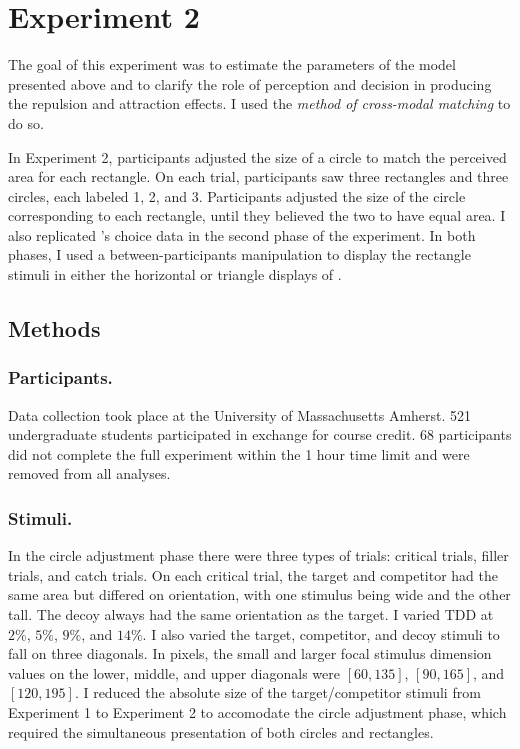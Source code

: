\section{Experiment 2}
The goal of this experiment was to estimate the parameters of the model presented above and to clarify the role of perception and decision in producing the repulsion and attraction effects. I used the \textit{method of cross-modal matching} \parencite{stevensCrossmodalityMatchingBrightness1965} to do so. 

In Experiment 2, participants adjusted the size of a circle to match the perceived area for each rectangle. On each trial, participants saw three rectangles and three circles, each labeled 1, 2, and 3. Participants adjusted the size of the circle corresponding to each rectangle, until they believed the two to have equal area. I also replicated \textcite{spektorWhenGoodLooks2018b}'s choice data in the second phase of the experiment. In both phases, I used a between-participants manipulation to display the rectangle stimuli in either the horizontal or triangle displays of \textcite{spektorWhenGoodLooks2018b}.

\subsection{Methods}
\subsubsection{Participants.}
Data collection took place at the University of Massachusetts Amherst. 521 undergraduate students participated in exchange for course credit. 68 participants did not complete the full experiment within the 1 hour time limit and were removed from all analyses. 

\subsubsection{Stimuli.}
In the circle adjustment phase there were three types of trials: critical trials, filler trials, and catch trials. On each critical trial, the target and competitor had the same area but differed on orientation, with one stimulus being wide and the other tall. The decoy always had the same orientation as the target. I varied TDD at $2\%$, $5\%$, $9\%$, and $14\%$. I also varied the target, competitor, and decoy stimuli to fall on three diagonals. In pixels, the small and larger focal stimulus dimension values on the lower, middle, and upper diagonals were $[60, 135]$, $[90, 165]$, and $[120,195]$. I reduced the absolute size of the target/competitor stimuli from Experiment 1 to Experiment 2 to accomodate the circle adjustment phase, which required the simultaneous presentation of both circles and rectangles.

